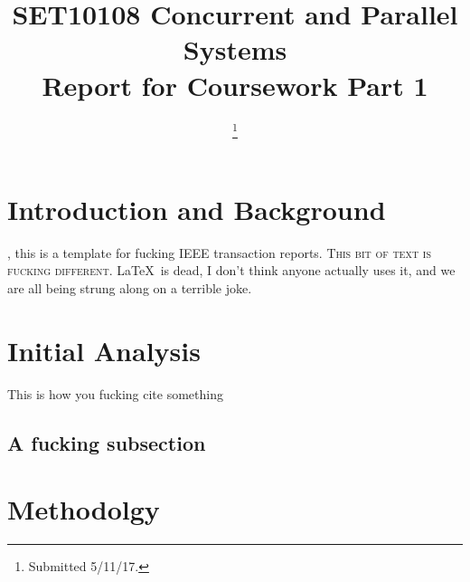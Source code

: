 \documentclass[journal,transmag]{IEEEtran}
\begin{document}
\title{SET10108 Concurrent and Parallel Systems\\Report for Coursework Part 1}

\author{

\thanks{Submitted 5/11/17.}}




\maketitle

\IEEEdisplaynontitleabstractindextext

\IEEEpeerreviewmaketitle

\section{Introduction and Background}
 
, this is a template for fucking IEEE transaction reports. \textsc{This bit of text is fucking different.} \LaTeX\ is dead, I don't think anyone actually uses it, and we are all being strung along on a terrible joke.

\section{Initial Analysis}
	\lipsum[1-2]
	This is how you fucking cite something \cite{mrx05}
	
	\subsection{A fucking subsection}
		
	
\section{Methodolgy}
	\lipsum[3-5]
\end{document}
